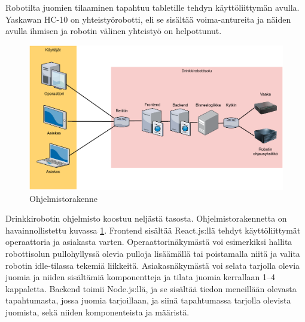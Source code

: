 Robotilta juomien tilaaminen tapahtuu tabletille tehdyn käyttöliittymän avulla. Yaskawan HC-10 on yhteistyörobotti, eli se sisältää voima-antureita ja näiden avulla ihmisen ja robotin välinen yhteistyö on helpottunut. \cite{Pullonkaula2020}

\begin{figure}[h]
\begin{center}
\includegraphics[scale=0.6]{img/rakenne.pdf}
\end{center}
\caption{Ohjelmistorakenne \cite[s. 11]{Kemppi2021}}
\label{fig:rakenne}
\end{figure}

Drinkkirobotin ohjelmisto koostuu neljästä tasosta. Ohjelmistorakennetta on havainnollistettu kuvassa \ref{fig:rakenne}. Frontend sisältää React.js:llä tehdyt käyttöliittymät operaattoria ja asiakasta varten. Operaattorinäkymästä voi esimerkiksi hallita robottisolun pullohyllyssä olevia pulloja lisäämällä tai poistamalla niitä ja valita robotin idle\hyp{}tilassa tekemiä liikkeitä. Asiakasnäkymästä voi selata tarjolla olevia juomia ja niiden sisältämiä komponentteja ja tilata juomia kerrallaan 1--4 kappaletta. Backend toimii Node.js:llä, ja se sisältää tiedon meneillään olevasta tapahtumasta, jossa juomia tarjoillaan, ja siinä tapahtumassa tarjolla olevista juomista, sekä niiden komponenteista ja määristä.

